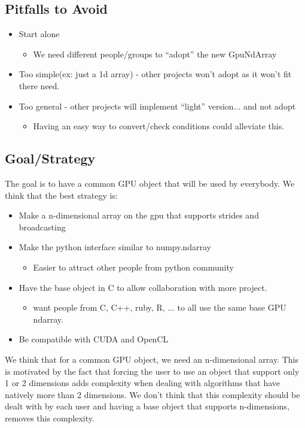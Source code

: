 \documentclass{article} %
\begin{document}
\subsection{Pitfalls to Avoid}
\begin{itemize}
\item Start alone
  \begin{itemize}
  \item We need different people/groups to ``adopt'' the new GpuNdArray
  \end{itemize}
\item Too simple(ex: just a 1d array) - other projects won't adopt as it won't fit there need.
\item Too general - other projects will implement ``light'' version... and not adopt
  \begin{itemize}
  \item Having an easy way to convert/check conditions could alleviate this.
  \end{itemize}
\end{itemize}

\subsection{Goal/Strategy}
The goal is to have a common GPU object that will be used by everybody. We think that the best strategy is:

\begin{itemize}
\item Make a n-dimensional array on the gpu that supports strides and broadcasting
\item Make the python interface similar to numpy.ndarray
  \begin{itemize}
  \item Easier to attract other people from python community
  \end{itemize}
\item Have the base object in C to allow collaboration with more project.
  \begin{itemize}
  \item  want people from C, C++, ruby, R, ... to all use the same base GPU ndarray.
  \end{itemize}
\item Be compatible with CUDA and OpenCL
\end{itemize}


We think that for a common GPU object, we need an n-dimensional
array. This is motivated by the fact that forcing the user to use an object that
support only 1 or 2 dimensions adds complexity when dealing with algorithms that have natively more than 2 dimensions.
We don't think that this complexity should be dealt with by each user and 
having a base object that supports n-dimensions, removes
this complexity.
\end{document}
